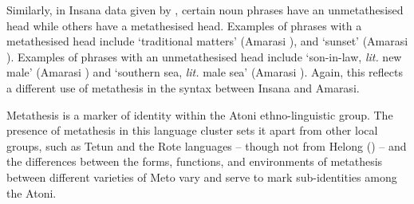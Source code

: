 Similarly, in Insana data given by \cite{scno71},
certain noun phrases have an unmetathesised head
while others have a metathesised head.
Examples of phrases with a metathesised head include
 `traditional matters' (Amarasi ),
and  `sunset' (Amarasi ).
Examples of phrases with an unmetathesised head include  `son-in-law,
\emph{lit.} new male' (Amarasi ) and
 `southern sea, \emph{lit.} male sea' (Amarasi ).
Again, this reflects a different use of metathesis in the syntax
between Insana and Amarasi.

Metathesis is a marker of identity within the Atoni ethno-linguistic group.
The presence of metathesis in this language cluster
sets it apart from other local groups, such as Tetun and the Rote languages
-- though not from Helong () --
and the differences between the forms, functions, and environments
of metathesis between different varieties of Meto
vary and serve to mark sub-identities among the Atoni.
